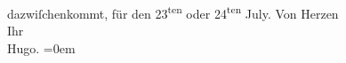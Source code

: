\begin{ledgroupsized}[t]{13cm}
                    dazwiſchenkommt, für den 23\textsuperscript{ten} oder 24\textsuperscript{ten} July.\pend
           \pstart
           Von Herzen{\\[\baselineskip]}Ihr{\\[\baselineskip]}\spacefill\mbox{Hugo.}\pend
           \leftskip=0em{}\endnumbering{}\end{ledgroupsized}  \newcommand{\dateiname}{L00697}\newcommand{\titel}{Hugo von Hofmannsthal an Arthur Schnitzler, 9. [7. 1897]}\newcommand{\editorInnen}{Martin Anton Müller und Gerd-Hermann Susen}
      